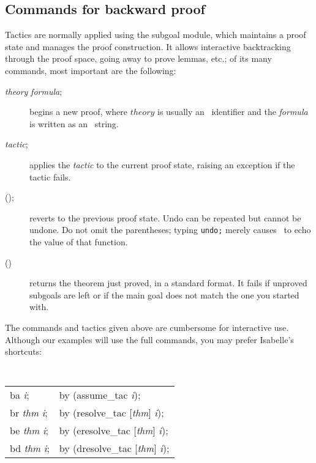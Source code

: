 \subsection{Commands for backward proof}
Tactics are normally applied using the subgoal module, which maintains a
proof state and manages the proof construction.  It allows interactive
backtracking through the proof space, going away to prove lemmas, etc.; of
its many commands, most important are the following:
\begin{description}
\item[ {\it theory} {\it formula}; ] 
begins a new proof, where $theory$ is usually an \ML\ identifier
and the {\it formula\/} is written as an \ML\ string.

\item[ {\it tactic}; ] 
applies the {\it tactic\/} to the current proof
state, raising an exception if the tactic fails.

\item[(); ]  
reverts to the previous proof state.  Undo can be repeated but cannot be
undone.  Do not omit the parentheses; typing {\tt undo;} merely causes \ML\
to echo the value of that function.

\item[()] 
returns the theorem just proved, in a standard format.  It fails if
unproved subgoals are left or if the main goal does not match the one you
started with.
\end{description}
The commands and tactics given above are cumbersome for interactive use.
Although our examples will use the full commands, you may prefer Isabelle's
shortcuts:
\begin{center} \tt
{}   
\begin{tabular}{l@{\qquad\rm abbreviates\qquad}l}
    ba {\it i};           & by (assume_tac {\it i}); \\

    br {\it thm} {\it i}; & by (resolve_tac [{\it thm}] {\it i}); \\

    be {\it thm} {\it i}; & by (eresolve_tac [{\it thm}] {\it i}); \\

    bd {\it thm} {\it i}; & by (dresolve_tac [{\it thm}] {\it i}); 
\end{tabular}
\end{center}

